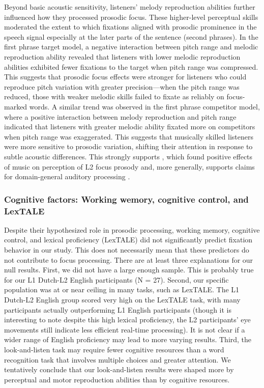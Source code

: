 Beyond basic acoustic sensitivity, listeners’ melody reproduction abilities further influenced how they processed prosodic focus. These higher-level perceptual skills moderated the extent to which fixations aligned with prosodic prominence in the speech signal especially at the later parts of the sentence (second phrases). In the first phrase target model, a negative interaction between pitch range and melodic reproduction ability revealed that listeners with lower melodic reproduction abilities exhibited fewer fixations to the target when pitch range was compressed. This suggests that prosodic focus effects were stronger for listeners who could reproduce pitch variation with greater precision—when the pitch range was reduced, those with weaker melodic skills failed to fixate as reliably on focus-marked words. A similar trend was observed in the first phrase competitor model, where a positive interaction between melody reproduction and pitch range indicated that listeners with greater melodic ability fixated more on competitors when pitch range was exaggerated. This suggests that musically skilled listeners were more sensitive to prosodic variation, shifting their attention in response to subtle acoustic differences. This strongly supports \textcite{jansen2023influence}, which found positive effects of music on perception of L2 focus prosody and, more generally, supports claims for domain-general auditory processing \parencite{saito2022does, bramlett_wiener_24_speechprosody, bakkouche2025effects, Kachlicka_Saito_Tierney_2019}.


\subsubsection{Cognitive factors: Working wemory, cognitive control, and LexTALE}

Despite their hypothesized role in prosodic processing, working memory, cognitive control, and lexical proficiency (LexTALE) did not significantly predict fixation behavior in our study. This does not necessarily mean that these predictors do not contribute to focus processing. There are at least three explanations for our null results. First, we did not have a large enough sample. This is probably true for our L1 Dutch-L2 English participants (N = 27). Second, our specific population was at or near ceiling in many tasks, such as LexTALE. The L1 Dutch-L2 English group scored very high on the LexTALE task, with many participants actually outperforming L1 English participants (though it is interesting to note despite this high lexical proficiency, the L2 participants' eye movements still indicate less efficient real-time processing). It is not clear if a wider range of English proficiency may lead to more varying results. Third, the look-and-listen task may require fewer cognitive resources than a word recognition task that involves multiple choices and greater attention. We tentatively conclude that our look-and-listen results were shaped more by perceptual and motor reproduction abilities than by cognitive resources.


